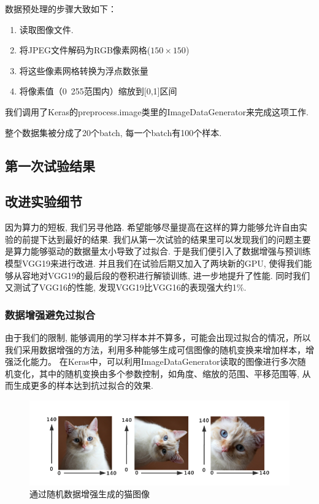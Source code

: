 \documentclass[lang=cn,11pt]{elegantpaper}
\begin{document}
  数据预处理的步骤大致如下：

\begin{enumerate}
	\item 读取图像文件.
	\item 将JPEG文件解码为RGB像素网格($150\times 150$)
	\item 将这些像素网格转换为浮点数张量
	\item 将像素值（0~255范围内）缩放到[0,1]区间
\end{enumerate}

我们调用了Keras的preprocess.image类里的ImageDataGenerator来完成这项工作.

整个数据集被分成了20个batch, 每一个batch有100个样本. 

\subsection{第一次试验结果}


\subsection{改进实验细节}

因为算力的短板, 我们另寻他路. 希望能够尽量提高在这样的算力能够允许自由实验的前提下达到最好的结果. 我们从第一次试验的结果里可以发现我们的问题主要是算力能够驱动的数据量太小导致了过拟合. 于是我们便引入了数据增强与预训练模型VGG19来进行改进. 并且我们在试验后期又加入了两块新的GPU, 使得我们能够从容地对VGG19的最后段的卷积进行解锁训练, 进一步地提升了性能. 同时我们又测试了VGG16的性能, 发现VGG19比VGG16的表现强大约1\%. 







\subsubsection{数据增强避免过拟合}
由于我们的限制, 能够调用的学习样本并不算多，可能会出现过拟合的情况，所以我们采用数据增强的方法，利用多种能够生成可信图像的随机变换来增加样本，增强泛化能力。 在Keras中，可以利用ImageDataGenerator读取的图像进行多次随机变化，其中的随机变换由多个参数控制，如角度、缩放的范围、平移范围等, 从而生成更多的样本达到抗过拟合的效果.

\begin{figure}[hbtp]
\centering
  \includegraphics{aug.png}
  \caption{通过随机数据增强生成的猫图像\label{fig:augcat}}
\end{figure}
\end{document}
